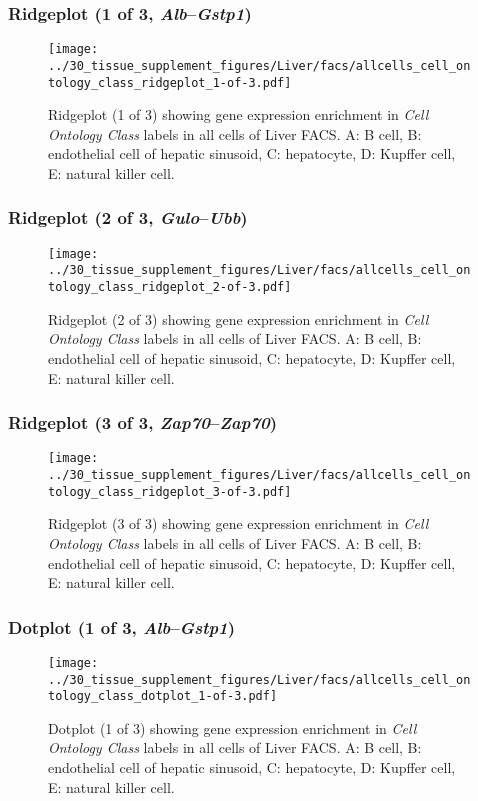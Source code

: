 \subsubsection{Ridgeplot (1 of 3, \emph{Alb}--\emph{Gstp1})}
\begin{figure}[h]
\centering
\texttt{[image: ../30\_tissue\_supplement\_figures/Liver/facs/allcells\_cell\_ontology\_class\_ridgeplot\_1-of-3.pdf]}

\caption{ Ridgeplot (1 of 3)  showing gene expression enrichment in \emph{Cell Ontology Class} labels in all cells of Liver FACS. A: B cell, B: endothelial cell of hepatic sinusoid, C: hepatocyte, D: Kupffer cell, E: natural killer cell.}
\end{figure}


\clearpage

\subsubsection{Ridgeplot (2 of 3, \emph{Gulo}--\emph{Ubb})}
\begin{figure}[h]
\centering
\texttt{[image: ../30\_tissue\_supplement\_figures/Liver/facs/allcells\_cell\_ontology\_class\_ridgeplot\_2-of-3.pdf]}

\caption{ Ridgeplot (2 of 3)  showing gene expression enrichment in \emph{Cell Ontology Class} labels in all cells of Liver FACS. A: B cell, B: endothelial cell of hepatic sinusoid, C: hepatocyte, D: Kupffer cell, E: natural killer cell.}
\end{figure}


\clearpage

\subsubsection{Ridgeplot (3 of 3, \emph{Zap70}--\emph{Zap70})}
\begin{figure}[h]
\centering
\texttt{[image: ../30\_tissue\_supplement\_figures/Liver/facs/allcells\_cell\_ontology\_class\_ridgeplot\_3-of-3.pdf]}

\caption{ Ridgeplot (3 of 3)  showing gene expression enrichment in \emph{Cell Ontology Class} labels in all cells of Liver FACS. A: B cell, B: endothelial cell of hepatic sinusoid, C: hepatocyte, D: Kupffer cell, E: natural killer cell.}
\end{figure}


\clearpage

\subsubsection{Dotplot (1 of 3, \emph{Alb}--\emph{Gstp1})}
\begin{figure}[h]
\centering
\texttt{[image: ../30\_tissue\_supplement\_figures/Liver/facs/allcells\_cell\_ontology\_class\_dotplot\_1-of-3.pdf]}

\caption{ Dotplot (1 of 3)  showing gene expression enrichment in \emph{Cell Ontology Class} labels in all cells of Liver FACS. A: B cell, B: endothelial cell of hepatic sinusoid, C: hepatocyte, D: Kupffer cell, E: natural killer cell.}
\end{figure}


